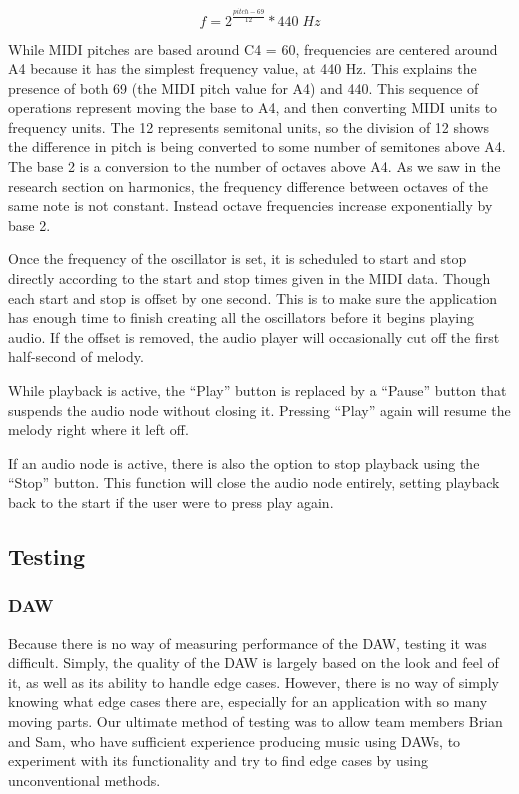 \begin{equation} \label{get_frequency}
  f = 2^{\frac{pitch - 69}{12}} * 440 \;Hz
\end{equation}

While MIDI pitches are based around C4 = 60, frequencies are centered around A4 because it has the
simplest frequency value, at 440 Hz. This explains the presence of both 69 (the MIDI pitch value
for A4) and 440. This sequence of operations represent moving the base to A4, and then converting
MIDI units to frequency units. The 12 represents semitonal units, so the division of 12 shows the
difference in pitch is being converted to some number of semitones above A4. The base 2 is a
conversion to the number of octaves above A4. As we saw in the research section on harmonics, the
frequency difference between octaves of the same note is not constant. Instead octave frequencies
increase exponentially by base 2.

Once the frequency of the oscillator is set, it is scheduled to start and stop directly according
to the start and stop times given in the MIDI data. Though each start and stop is offset by one
second. This is to make sure the application has enough time to finish creating all the oscillators
before it begins playing audio. If the offset is removed, the audio player will occasionally cut
off the first half-second of melody.

While playback is active, the “Play” button is replaced by a “Pause” button that suspends the audio
node without closing it. Pressing “Play” again will resume the melody right where it left off.

If an audio node is active, there is also the option to stop playback using the “Stop” button. This
function will close the audio node entirely, setting playback back to the start if the user were to
press play again.


\subsection{Testing}

\subsubsection{DAW}

Because there is no way of measuring performance of the DAW, testing it was difficult. Simply, the
quality of the DAW is largely based on the look and feel of it, as well as its ability to handle
edge cases. However, there is no way of simply knowing what edge cases there are, especially for
an application with so many moving parts. Our ultimate method of testing was to allow team members
Brian and Sam, who have sufficient experience producing music using DAWs, to experiment with its
functionality and try to find edge cases by using unconventional methods.

